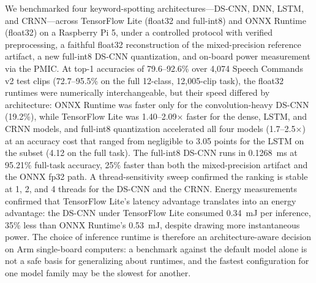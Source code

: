 \documentclass[conference,a4paper]{IEEEtran}
\begin{document}
We benchmarked four keyword-spotting architectures---DS-CNN, DNN, LSTM, and CRNN---across TensorFlow Lite (float32 and full-int8) and ONNX Runtime (float32) on a Raspberry Pi 5, under a controlled protocol with verified preprocessing, a faithful float32 reconstruction of the mixed-precision reference artifact, a new full-int8 DS-CNN quantization, and on-board power measurement via the PMIC. At top-1 accuracies of 79.6--92.6\% over 4{,}074 Speech Commands v2 test clips (72.7--95.5\% on the full 12-class, 12{,}005-clip task), the float32 runtimes were numerically interchangeable, but their speed differed by architecture: ONNX Runtime was faster only for the convolution-heavy DS-CNN (19.2\%), while TensorFlow Lite was 1.40--2.09$\times$ faster for the dense, LSTM, and CRNN models, and full-int8 quantization accelerated all four models (1.7--2.5$\times$) at an accuracy cost that ranged from negligible to 3.05 points for the LSTM on the subset (4.12 on the full task). The full-int8 DS-CNN runs in 0.1268~ms at 95.21\% full-task accuracy, 25\% faster than both the mixed-precision artifact and the ONNX fp32 path. A thread-sensitivity sweep confirmed the ranking is stable at 1, 2, and 4 threads for the DS-CNN and the CRNN. Energy measurements confirmed that TensorFlow Lite's latency advantage translates into an energy advantage: the DS-CNN under TensorFlow Lite consumed 0.34~mJ per inference, 35\% less than ONNX Runtime's 0.53~mJ, despite drawing more instantaneous power. The choice of inference runtime is therefore an architecture-aware decision on Arm single-board computers: a benchmark against the default model alone is not a safe basis for generalizing about runtimes, and the fastest configuration for one model family may be the slowest for another.



\end{document}
